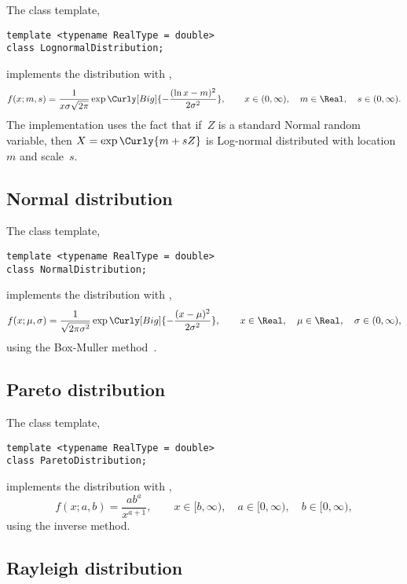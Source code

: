 The class template,
\begin{verbatim}
template <typename RealType = double>
class LognormalDistribution;
\end{verbatim}
implements the distribution with \pdf,
\begin{equation*}
  f(x;m,s) =
  \frac{1}{x\sigma\sqrt{2\pi}}
  \exp\Curly[Big]{-\frac{(\ln x - m)^2}{2\sigma^2}},\qquad
  x \in (0, \infty),\quad m \in \Real,\quad s \in (0, \infty).
\end{equation*}
The implementation uses the fact that if~$Z$ is a standard Normal random
variable, then $X = \exp\Curly{m + sZ}$ is Log-normal distributed with
location~$m$ and scale~$s$.

\subsection{Normal distribution}
\label{sub:Normal distribution}

The class template,
\begin{verbatim}
template <typename RealType = double>
class NormalDistribution;
\end{verbatim}
implements the distribution with \pdf,
\begin{equation*}
  f(x;\mu,\sigma) =
  \frac{1}{\sqrt{2\pi\sigma^2}}
  \exp\Curly[Big]{-\frac{(x-\mu)^2}{2\sigma^2}},\qquad
  x \in \Real,\quad \mu \in \Real,\quad \sigma \in (0, \infty),
\end{equation*}
using the Box-Muller method~\cite{Box:1958hv}.

\subsection{Pareto distribution}
\label{sub:Pareto distribution}

The class template,
\begin{verbatim}
template <typename RealType = double>
class ParetoDistribution;
\end{verbatim}
implements the distribution with \pdf,
\begin{equation*}
  f(x;a,b) = \frac{a b^a}{x^{a + 1}},\qquad
  x \in [b, \infty),\quad a \in [0, \infty),\quad b \in [0, \infty),
\end{equation*}
using the inverse method.

\subsection{Rayleigh distribution}
\label{sub:Rayleigh distribution}

